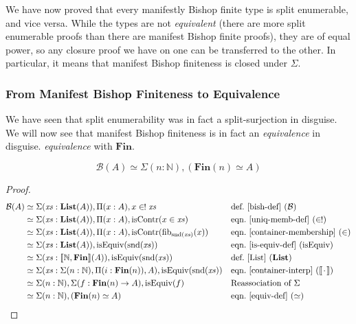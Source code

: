 We have now proved that every manifestly Bishop finite type is split enumerable,
and vice versa.
While the types are not \emph{equivalent} (there are more split enumerable
proofs than there are manifest Bishop finite proofs), they are of equal power,
so any closure proof we have on one can be transferred to the other.
In particular, it means that manifest Bishop finiteness is closed under
\(\Sigma\).
\subsubsection{From Manifest Bishop Finiteness to Equivalence}
We have seen that split enumerability was in fact a split-surjection in
disguise.
We will now see that manifest Bishop finiteness is in fact an \emph{equivalence}
in disguise.
\emph{equivalence} with \(\mathbf{Fin}\).
\begin{lemma} \label{bishop-equiv}
  \begin{equation}
    \mathcal{B}(A) \simeq \Sigma {(n : \mathbb{N})} , \left( \mathbf{Fin}(n) \simeq A \right)
  \end{equation}
\end{lemma}
\begin{proof}
  \begin{align*}
     \mathcal{B}(A) &
    \simeq \Sigma (\mathit{xs} : \textbf{List}(A)) , \Pi {(x : A)} , x \inunique \mathit{xs}
    && \text{def.~\ref{bish-def} }(\mathcal{B})
    \\
    & \simeq \Sigma (\mathit{xs} : \textbf{List}(A)) , \Pi {(x : A)} , \text{isContr}(x \in \mathit{xs})
    && \text{eqn.~\ref{uniq-memb-def} } (\inunique)
    \\
    & \simeq \Sigma (\mathit{xs} : \textbf{List}(A)) , \Pi {(x : A)} , \text{isContr}(\text{fib}_{\text{snd}(\mathit{xs})}(x))
    && \text{eqn.~\ref{container-membership} } (\in)
    \\
    & \simeq \Sigma (\mathit{xs} : \textbf{List}(A)) , \text{isEquiv}(\text{snd}(\mathit{xs}))
    && \text{eqn.~\ref{is-equiv-def} (isEquiv)}
    \\
    & \simeq \Sigma (\mathit{xs} : \llbracket \mathbb{N} , \mathbf{Fin} \rrbracket (A)) , \text{isEquiv}(\text{snd}(\mathit{xs}))
    && \text{def.~\ref{List} } (\mathbf{List})
    \\
    & \simeq \Sigma (\mathit{xs} : \Sigma (n : \mathbb{N}) , \Pi (i : \mathbf{Fin}(n)) , A) , \text{isEquiv}(\text{snd}(\mathit{xs}))
    && \text{eqn.~\ref{container-interp} } (\llbracket \wc \rrbracket)
    \\
    & \simeq \Sigma (n : \mathbb{N}) , \Sigma (f : \mathbf{Fin}(n) \rightarrow A) , \text{isEquiv}(f)
    && \text{Reassociation of } \Sigma
    \\
    & \simeq \Sigma (n : \mathbb{N}) , ( \mathbf{Fin}(n) \simeq A )
    && \text{eqn.~\ref{equiv-def} } (\simeq)
  \end{align*}
\end{proof}
